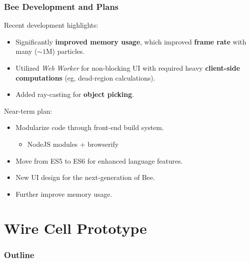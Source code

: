 \documentclass[xcolor=dvipsnames]{beamer}
\begin{document}
\begin{frame}
  \frametitle{Bee Development and Plans}
  Recent development highlights:
  \begin{itemize}
  \item Significantly \textbf{improved memory usage}, which improved
    \textbf{frame rate} with many ($\sim1$M) particles.
  \item Utilized \textit{Web Worker} for non-blocking UI with required heavy
    \textbf{client-side computations} (eg, dead-region calculations).
  \item Added ray-casting for \textbf{object picking}.
  \end{itemize}

  \vfill

  Near-term plan:
  \begin{itemize}
  \item Modularize code through front-end build system.
    \begin{itemize}
    \item NodeJS modules + browserify
    \end{itemize}
  \item Move from ES5 to ES6 for enhanced language features.
  \item New UI design for the next-generation of Bee.
  \item Further improve memory usage.
  \end{itemize}
  
\end{frame}


\section{Wire Cell Prototype}

\begin{frame}
  \frametitle{Outline}
  \tableofcontents[currentsection]
\end{frame}
\end{document}

